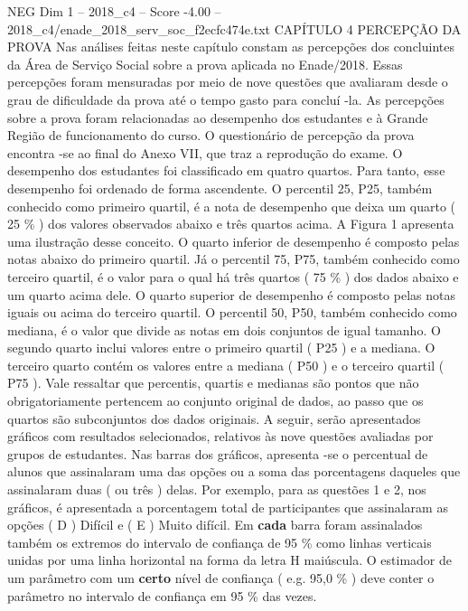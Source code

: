 \begin{textsample}{NEG Dim 1 – 2018\_c4 – Score -4.00 – 2018\_c4/enade\_2018\_serv\_soc\_f2ecfc474e.txt}  \label{ex:f1_neg_135}
CAPÍTULO 4 PERCEPÇÃO DA PROVA Nas análises feitas neste capítulo constam as percepções dos concluintes da Área de Serviço Social sobre a prova aplicada no Enade/2018.
Essas percepções foram mensuradas por meio de nove questões que avaliaram desde o grau de dificuldade da prova até o tempo gasto para concluí -la.
As percepções sobre a prova foram relacionadas ao desempenho dos estudantes e à Grande Região de funcionamento do curso.
O questionário de percepção da prova encontra -se ao final do Anexo VII, que traz a reprodução do exame.
O desempenho dos estudantes foi classificado em quatro quartos.
Para tanto, esse desempenho foi ordenado de forma ascendente.
O percentil 25, P25, também conhecido como primeiro quartil, é a nota de desempenho que deixa um quarto ( 25 \% ) dos valores observados abaixo e três quartos acima.
A Figura 1 apresenta uma ilustração desse conceito.
O quarto inferior de desempenho é composto pelas notas abaixo do primeiro quartil.
Já o percentil 75, P75, também conhecido como terceiro quartil, é o valor para o qual há três quartos ( 75 \% ) dos dados abaixo e um quarto acima dele.
O quarto superior de desempenho é composto pelas notas iguais ou acima do terceiro quartil.
O percentil 50, P50, também conhecido como mediana, é o valor que divide as notas em dois conjuntos de igual tamanho.
O segundo quarto inclui valores entre o primeiro quartil ( P25 ) e a mediana.
O terceiro quarto contém os valores entre a mediana ( P50 ) e o terceiro quartil ( P75 ).
Vale ressaltar que percentis, quartis e medianas são pontos que não obrigatoriamente pertencem ao conjunto original de dados, ao passo que os quartos são subconjuntos dos dados originais.
A seguir, serão apresentados gráficos com resultados selecionados, relativos às nove questões avaliadas por grupos de estudantes.
Nas barras dos gráficos, apresenta -se o percentual de alunos que assinalaram uma das opções ou a soma das porcentagens daqueles que assinalaram duas ( ou três ) delas.
Por exemplo, para as questões 1 e 2, nos gráficos, é apresentada a porcentagem total de participantes que assinalaram as opções ( D ) Difícil e ( E ) Muito difícil.
Em \textbf{cada} barra foram assinalados também os extremos do intervalo de confiança de 95 \% como linhas verticais unidas por uma linha horizontal na forma da letra H maiúscula.
O estimador de um parâmetro com um \textbf{certo} nível de confiança ( e.g. 95,0 \% ) deve conter o parâmetro no intervalo de confiança em 95 \% das vezes.

\end{textsample}
